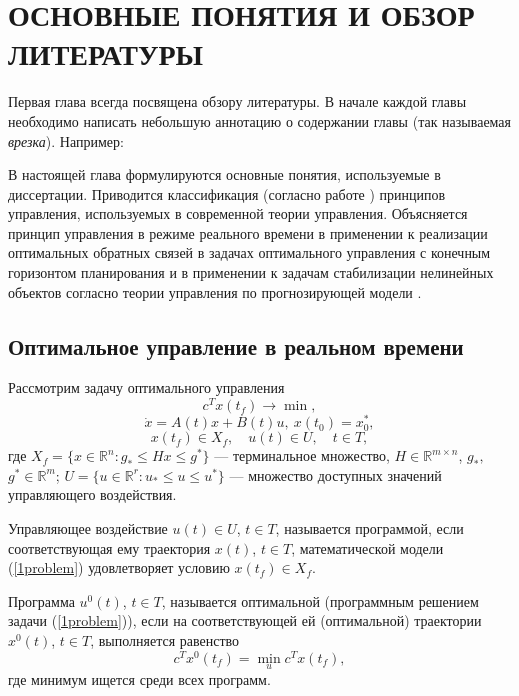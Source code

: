 \chapter{ОСНОВНЫЕ ПОНЯТИЯ И ОБЗОР ЛИТЕРАТУРЫ }\label{chap1}

Первая глава всегда посвящена обзору литературы. В начале каждой главы необходимо написать небольшую аннотацию о содержании главы (так называемая \textit{врезка}). Например:

В настоящей глава формулируются основные понятия, используемые в диссертации. Приводится классификация (согласно работе \cite{GabasovKirillovaPU}) принципов управления, используемых в современной теории управления. Объясняется принцип управления в режиме реального времени в применении к реализации оптимальных обратных связей в задачах оптимального управления с конечным горизонтом планирования \cite{GabasovDmitrukKirillova15a} и в применении к задачам стабилизации нелинейных объектов согласно теории  управления по прогнозирующей модели \cite{Mayne}.


\section{Оптимальное управление в  реальном времени}\label{1sec:optimal-control}


Рассмотрим задачу оптимального управления
\begin{equation} \label{1problem}
    c^Tx(t_f)\to \min,
    \end{equation}
$$
    \dot{x}=A(t)x+B(t)u,\ x(t_0)=x_0^*,
    $$
$$
    x(t_f) \in X_f,\quad  u(t)\in U, \quad  t\in T,
    $$
где  $X_f=\{x\in \mathbb{R}^n: g_*\leq Hx \leq g^*\}$ --- терминальное
множество, $H\in \mathbb{R}^{m\times n}$, $g_*,$ $g^* \in \mathbb{R}^m$;
$U=\{u\in \mathbb{R}^r: u_*\le u\le u^*\}$ --- множество доступных значений
управляющего воздействия.

\begin{definition}  Управляющее воздействие $u(t)\in U$, $t\in T$, называется программой, если соответствующая ему
траектория $x(t)$, $t\in T$, математической модели (\ref{1problem}) удовлетворяет
условию $x(t_f)\in X_f$.
\end{definition}

\begin{definition}  Программа $u^0(t)$, $t\in T$,
называется оптимальной (программным решением задачи (\ref{1problem})), если на соответствующей ей (оптимальной) траектории $x^0(t)$, $t\in T$, выполняется равенство
$$
    c^Tx^0(t_f) = \min_u c^Tx(t_f),
     $$
где минимум ищется среди всех программ.
\end{definition}

